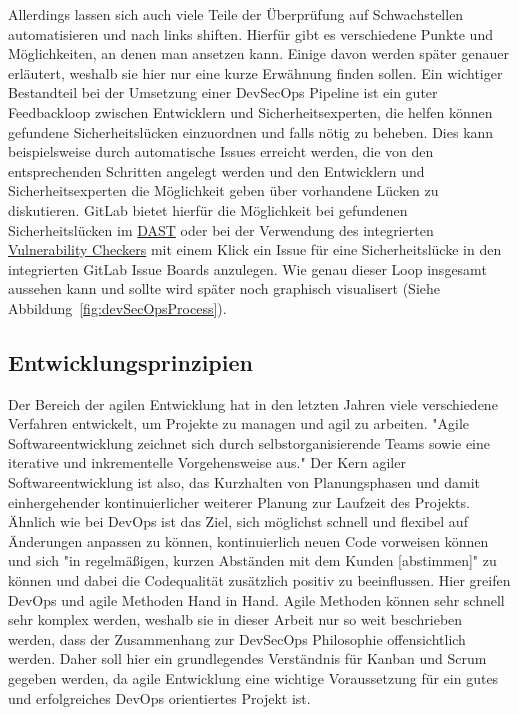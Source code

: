 Allerdings lassen sich auch viele Teile der Überprüfung auf Schwachstellen automatisieren und nach links shiften.
Hierfür gibt es verschiedene Punkte und Möglichkeiten, an denen man ansetzen kann.
Einige davon werden später genauer erläutert, weshalb sie hier nur eine kurze Erwähnung finden sollen.
Ein wichtiger Bestandteil bei der Umsetzung einer DevSecOps Pipeline ist ein guter Feedbackloop zwischen Entwicklern und Sicherheitsexperten, die helfen können gefundene Sicherheitslücken einzuordnen und falls nötig zu beheben.
Dies kann beispielsweise durch automatische Issues erreicht werden, die von den entsprechenden Schritten angelegt werden und den Entwicklern und Sicherheitsexperten die Möglichkeit geben über vorhandene Lücken zu diskutieren.
GitLab bietet hierfür die Möglichkeit bei gefundenen Sicherheitslücken im \hyperref[subsubsec:dast]{DAST} oder bei der Verwendung des integrierten \hyperref[subsubsec:vulChecker]{Vulnerability Checkers} mit einem Klick ein Issue für eine Sicherheitslücke in den integrierten GitLab Issue Boards anzulegen.
Wie genau dieser Loop insgesamt aussehen kann und sollte wird später noch graphisch visualisert (Siehe Abbildung~\ref{fig:devSecOpsProcess}).

\subsection{Entwicklungsprinzipien}

Der Bereich der agilen Entwicklung hat in den letzten Jahren viele verschiedene Verfahren entwickelt, um Projekte zu managen und agil zu arbeiten.
"Agile Softwareentwicklung zeichnet sich durch selbstorganisierende Teams sowie eine iterative und inkrementelle Vorgehensweise aus."\cite{AgileSoftwareentwicklung2021}
Der Kern agiler Softwareentwicklung ist also, das Kurzhalten von Planungsphasen und damit einhergehender kontinuierlicher weiterer Planung zur Laufzeit des Projekts.
Ähnlich wie bei DevOps ist das Ziel, sich möglichst schnell und flexibel auf Änderungen anpassen zu können, kontinuierlich neuen Code vorweisen können und sich "in regelmäßigen, kurzen Abständen mit dem Kunden [abstimmen]"\cite{AgileSoftwareentwicklung2021} zu können und dabei die Codequalität zusätzlich positiv zu beeinflussen.
Hier greifen DevOps und agile Methoden Hand in Hand.
Agile Methoden können sehr schnell sehr komplex werden, weshalb sie in dieser Arbeit nur so weit beschrieben werden, dass der Zusammenhang zur DevSecOps Philosophie offensichtlich werden.
Daher soll hier ein grundlegendes Verständnis für Kanban und Scrum gegeben werden, da agile Entwicklung eine wichtige Voraussetzung für ein gutes und erfolgreiches DevOps orientiertes Projekt ist.

